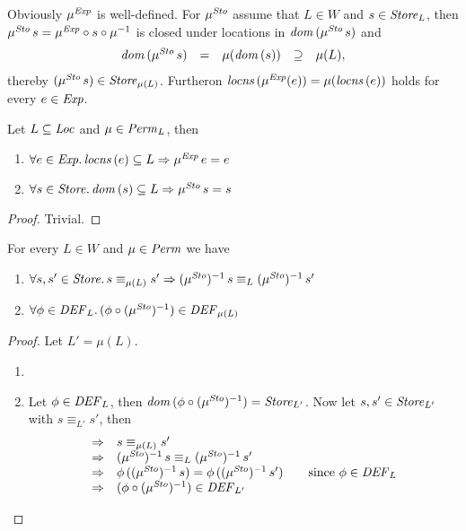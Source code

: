 \documentclass[12pt,a4paper]{report}
\newcommand{\Sto}{\nstyle{Sto}}
\newcommand{\DEF}{\nstyle{DEF}}
\begin{document}
Obviously $\mu^{\mathit{Exp}}$ is well-defined. For $\mu^\Sto$ assume that $L \in W$ and $s\in\mathit{Store}_L$,
then $\mu^\Sto\,s = \mu^\Exp \circ s \circ \mu^{-1}$ is closed under locations in
$\dom{\mu^\Sto\,s}$ and
\[\begin{array}{rccccl}
  \dom{\mu^\Sto\,s} &=& \mu(\dom{s}) &\supseteq& \mu(L),
\end{array}\]
thereby $(\mu^\Sto\,s) \in \Store_{\mu(L)}$. Furtheron $\mathit{locns}\,(\mu^{\mathit{Exp}}(e)) = \mu(\mathit{locns}\,(e))$
holds for every $e \in \mathit{Exp}$.

\begin{lemma}
  Let $L \subseteq \mathit{Loc}$ and $\mu \in \mathit{Perm}_L$, then
  \begin{enumerate}
    \item $\forall e\in\mathit{Exp}.\,\mathit{locns}\,(e) \subseteq L \Rightarrow \mu^{\mathit{Exp}}\,e = e$
    \item $\forall s\in\Store.\,\dom{s} \subseteq L \Rightarrow \mu^\Sto\,s = s$
  \end{enumerate}
\end{lemma}

\begin{proof}
  Trivial.
\end{proof}

\begin{lemma}
  For every $L \in W$ and $\mu \in \mathit{Perm}$ we have
  \begin{enumerate}
    \item $\forall s,s'\in\Store.\,s \equiv_{\mu(L)} s'
            \Rightarrow (\mu^\Sto)^{-1}\,s \equiv_L (\mu^\Sto)^{-1}\,s'$
    \item $\forall \phi\in\DEF_L.\, (\phi\circ (\mu^\Sto)^{-1}) \in \DEF_{\mu(L)}$
  \end{enumerate}
\end{lemma}

\begin{proof}
  Let $L' = \mu(L)$.
  \begin{enumerate}
    \item 

    \item Let $\phi\in\DEF_L$, then $\dom{\phi \circ (\mu^\Sto)^{-1}} = \Store_{L'}$. Now
          let $s,s'\in\mathit{Store}_{L'}$ with $s \equiv_{L'} s'$, then
          \[\begin{array}{rl}
            \Rightarrow & s \equiv_{\mu(L)} s' \\
            \Rightarrow & (\mu^\Sto)^{-1} \, s \equiv_L (\mu^\Sto)^{-1} \, s' \\
            \Rightarrow & \phi\,((\mu^\Sto)^{-1}\, s) = \phi\,((\mu^\Sto)^{-1}\, s')
                          \quad \quad \text{since } \phi \in \DEF_L \\
            \Rightarrow & (\phi\circ (\mu^\Sto)^{-1}) \in \DEF_{L'}
          \end{array}\]
  \end{enumerate}
\end{proof}
\end{document}

